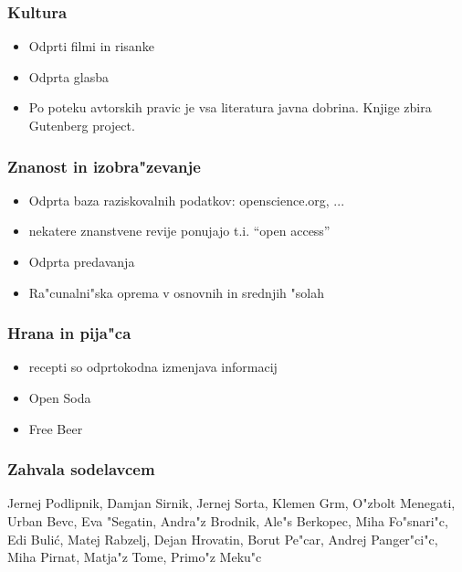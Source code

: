 \documentclass{beamer}
\begin{document}
\begin{frame}
\frametitle{Kultura}
\begin{itemize}
\item Odprti filmi in risanke
\item Odprta glasba
\item Po poteku avtorskih pravic je vsa literatura javna dobrina. Knjige zbira Gutenberg project.
\end{itemize}
\end{frame}

\begin{frame}
\frametitle{Znanost in izobra"zevanje}
\begin{itemize}
\item Odprta baza raziskovalnih podatkov: openscience.org, ...
\item nekatere znanstvene revije ponujajo t.i. ``open access''
\item Odprta predavanja
\item Ra"cunalni"ska oprema v osnovnih in srednjih "solah
\end{itemize}
\end{frame}
\begin{frame}
\frametitle{Hrana in pija"ca}
\begin{itemize}
\item recepti so odprtokodna izmenjava informacij
\item Open Soda
\item Free Beer
\end{itemize}
\end{frame}

\begin{frame}
\frametitle{Zahvala sodelavcem}
Jernej Podlipnik, Damjan Sirnik, Jernej Sorta, Klemen Grm, O"zbolt Menegati, Urban Bevc, Eva "Segatin, Andra"z Brodnik, Ale"s Berkopec, Miha Fo"snari"c, Edi Buli\'{c}, Matej Rabzelj, Dejan Hrovatin, Borut Pe"car, Andrej Panger"ci"c, Miha Pirnat, Matja"z Tome, Primo"z Meku"c 
\end{frame}
\end{document}
